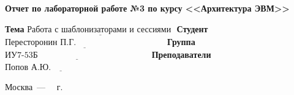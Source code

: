\documentclass[a4paper,14pt, unknownkeysallowed]{extreport}
\begin{document}
\begin{titlepage}
\begin{center}
    \Large\textbf{Отчет по лабораторной работе №3 по курсу <<Архитектура ЭВМ>>}
\end{center}

\noindent\textbf{Тема} $\underline{\text{Работа с шаблонизаторами и сессиями~}}$\newline\newline
\noindent\textbf{Студент} $\underline{\text{Пересторонин П.Г.~~~~~~~~~~~~~~~~~~~~~~~~~~~~~~~}}$\newline\newline
\noindent\textbf{Группа} $\underline{\text{ИУ7-53Б~~~~~~~~~~~~~~~~~~~~~~~~~~~~~~~~~~~~~~~}}$\newline\newline
\noindent\textbf{Преподаватели} $\underline{\text{Попов А.Ю.~~~~~~~~~~~~~~~~~~~~~~~}}$\newline

\begin{center}
    \vfill
    Москва~---~\the\year
    ~г.
\end{center}
\restoregeometry
\end{titlepage}
\end{document}

